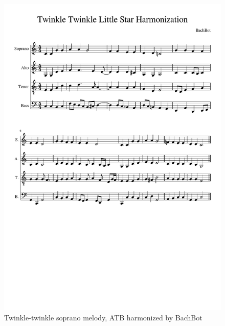 \begin{figure}[tb]
  \centering
  \includegraphics[trim={0 10cm 0 3.7cm},clip,width=0.9\linewidth]{twinkle-twinkle-score.pdf}
  \caption{Twinkle-twinkle soprano melody, ATB harmonized by BachBot}
  \label{fig:harm-twinkle-twinkle}
\end{figure}

